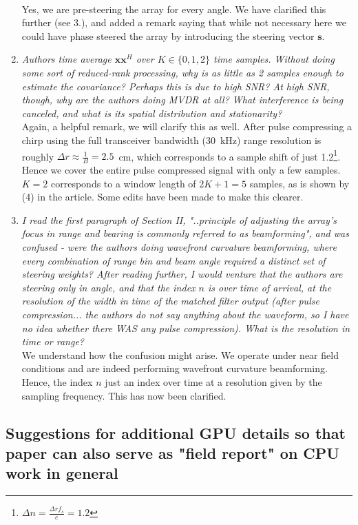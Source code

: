 \documentclass[11pt]{article} %
\renewcommand\H{^{\scriptscriptstyle H}}
\renewcommand\vec[1]{\boldsymbol{#1}}
\newcommand\1{\vec 1}
\newcommand*\x{\vec x}
\newcommand\q[1]{\textit{#1}}
\newcommand\qi[1]{\item\q{#1}}
\newcommand\ans[1]{#1}
\newcommand\ai[1]{\\[.5\baselineskip]\ans{#1}}
\begin{document}
\begin{enumerate}
\ai{Yes, we are pre-steering the array for every angle. We have clarified this further (see 3.), and added a remark saying that while not necessary here we could have phase steered the array by introducing the steering vector $\vec s$.}
%
\qi{Authors time average $\x\x\H$ over $K\in\{0, 1, 2\}$ time samples. Without doing some sort of reduced-rank processing, why is as little as 2 samples enough to estimate the covariance? Perhaps this is due to high SNR? At high SNR, though, why are the authors doing MVDR at all? What interference is being canceled, and what is its spatial distribution and stationarity? }
\ai{Again, a helpful remark, we will clarify this as well. After pulse compressing a chirp using the full transceiver bandwidth (30~kHz) range resolution is roughly $\Delta r \approx \frac{1}{B} = 2.5$~cm, which corresponds to a sample shift of just 1.2\footnote{$\Delta n = \frac{\Delta r f_s}{c} = 1.2$}. Hence we cover the entire pulse compressed signal with only a few samples. $K=2$ corresponds to a window length of $2K+1=5$ samples, as is shown by (4) in the article. Some edits have been made to make this clearer.} 
%
\qi{I read the first paragraph of Section II, "..principle of adjusting the array's focus in range and bearing is commonly referred to as beamforming", and was confused - were the authors doing wavefront curvature beamforming, where every combination of range bin and beam angle required a distinct set of steering weights? After reading further, I would venture that the authors are steering only in angle, and that the index $n$ is over time of arrival, at the resolution of the width in time of the matched filter output (after pulse compression... the authors do not say anything about the waveform, so I have no idea whether there WAS any pulse compression). What is the resolution in time or range? }
\ai{We understand how the confusion might arise. We operate under near field conditions and are indeed performing wavefront curvature beamforming. Hence, the index $n$ just an index over time at a resolution given by the sampling frequency. This has now been clarified.}
\end{enumerate}


\subsection{Suggestions for additional GPU details so that paper can also serve as "field report" on CPU work in general}
\end{document}
